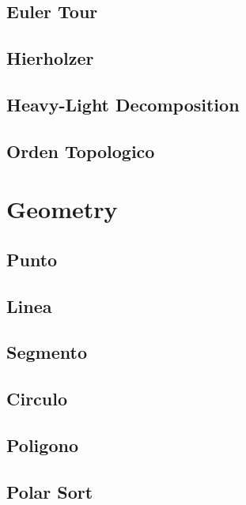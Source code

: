\subsection{Euler Tour}
\raggedbottom
\hrulefill
\subsection{Hierholzer}
\raggedbottom
\hrulefill
\subsection{Heavy-Light Decomposition}
\raggedbottom
\hrulefill
\subsection{Orden Topologico}
\raggedbottom
\hrulefill
\newpage

\section{Geometry}
\subsection{Punto}
\raggedbottom
\hrulefill
\subsection{Linea}
\raggedbottom
\hrulefill
\subsection{Segmento}
\raggedbottom
\hrulefill
\subsection{Circulo}
\raggedbottom
\hrulefill
\subsection{Poligono}
\raggedbottom
\hrulefill
\subsection{Polar Sort}
\raggedbottom
\hrulefill
